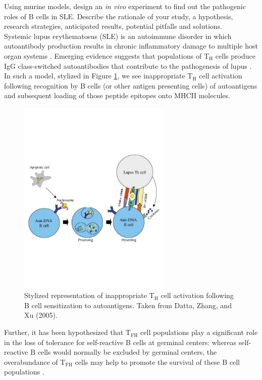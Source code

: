 \documentclass[11pt,letterpaper,final] {article}
\newcommand{\sub}[1]{\ensuremath{_{\text{#1}}}}
\newenvironment{exercise}[2][Exercise]{\begin{trivlist}
	\item[\hskip \labelsep {\bfseries #1}\hskip \labelsep {\bfseries #2.}]}{\end{trivlist}}
\begin{document}
\begin{exercise}[Exercise]{4} Using murine models, design an \textit{in vivo} experiment to find out the pathogenic roles of B cells in SLE.  Describe the rationale of your study, a hypothesis, research strategies, anticipated results, potential pitfalls and solutions.\\

Systemic lupus erythematosus (SLE) is an autoimmune disorder in which autoantibody production results in chronic inflammatory damage to multiple host organ systems \cite{Dong:2011}. Emerging evidence suggests that populations of T\sub{H} cells produce IgG class-switched autoantibodies that contribute to the pathogenesis of lupus \cite{Datta:2005}. In such a model, stylized in Figure \ref{fig:02}, we see inappropriate T\sub{H} cell activation following recognition by B cells (or other antigen presenting cells) of autoantigens and subsequent loading of those peptide epitopes onto MHCII molecules.

\begin{figure}[htp]
  \centering
    \includegraphics[width=0.65\textwidth]{sensitization}
	\caption{Stylized representation of inappropriate T\sub{H} cell activation following B cell sensitization to autoantigens. Taken from Datta, Zhang, and Xu (2005).}
	\label{fig:02}
\end{figure}

Further, it has been hypothesized that T\sub{FH} cell populations play a significant role in the loss of tolerance for self-reactive B cells at germinal centers: whereas self-reactive B cells would normally be excluded by germinal centers, the overabundance of T\sub{FH} cells may help to promote the survival of these B cell populations \cite{Dong:2011}.


\end{exercise}
\end{document}
